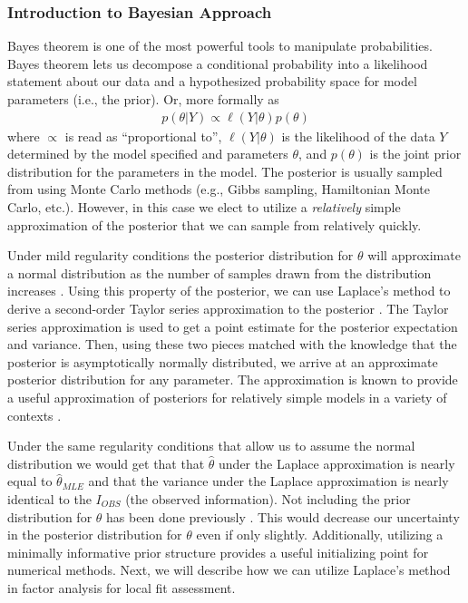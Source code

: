 \documentclass[man, noextraspace, floatsintext, 12pt]{apa7}
\begin{document}
\subsubsection{Introduction to Bayesian Approach}

Bayes theorem is one of the most powerful tools to manipulate probabilities. 
Bayes theorem lets us decompose a conditional probability into a likelihood statement about our data and a hypothesized probability space for model parameters (i.e., the prior). Or, more formally as
\begin{align*}
p(\theta \vert Y) \propto \ell (Y \vert \theta)p(\theta)
\end{align*}
where $\propto$ is read as ``proportional to'', $\ell (Y \vert \theta)$ is the likelihood of the data $Y$ determined by the model specified and parameters $\theta$, and $p(\theta)$ is the joint prior distribution for the parameters in the model.
The posterior is usually sampled from using Monte Carlo methods (e.g., Gibbs sampling, Hamiltonian Monte Carlo, etc.).
However, in this case we elect to utilize a \textit{relatively} simple approximation of the posterior that we can sample from relatively quickly.

Under mild regularity conditions the posterior distribution for $\theta$ will approximate a normal distribution as the number of samples drawn from the distribution increases \citep{DBA3}.
Using this property of the posterior, we can use Laplace's method to derive a second-order Taylor series approximation to the posterior \citep{Tierney1986}.
The Taylor series approximation is used to get a point estimate for the posterior expectation and variance.
Then, using these two pieces matched with the knowledge that the posterior is asymptotically normally distributed, we arrive at an approximate posterior distribution for any parameter. 
The approximation is known to provide a useful approximation of posteriors for relatively simple models in a variety of contexts \citep{Kass1989, Rue2009}.

Under the same regularity conditions that allow us to assume the normal distribution we would get that that $\hat{\theta}$ under the Laplace approximation is nearly equal to $\hat{\theta}_{MLE}$ and that the variance under the Laplace approximation is nearly identical to the $I_{OBS}$  (the observed information). %
Not including the prior distribution for $\theta$ has been done previously \citep{Lee2016, Rue2009, Wolfinger1993, Li1992}.
This would decrease our uncertainty in the posterior distribution for $\theta$ even if only slightly.
Additionally, utilizing a minimally informative prior structure provides a useful initializing point for numerical methods.
Next, we will describe how we can utilize Laplace's method in factor analysis for local fit assessment.
\end{document}
